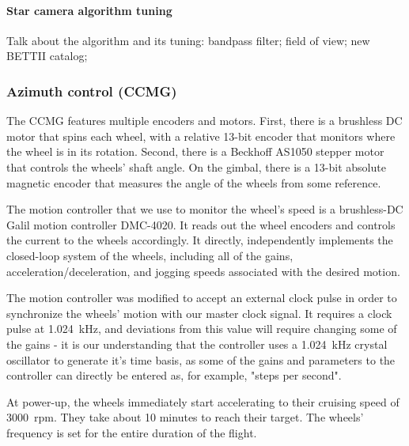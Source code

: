 \paragraph{Star camera algorithm tuning}

Talk about the algorithm and its tuning: bandpass filter; field of view; new BETTII catalog;
\subsubsection{Azimuth control (CCMG)}

The CCMG features multiple encoders and motors. First, there is a brushless DC motor that spins each wheel, with a relative 13-bit encoder that monitors where the wheel is in its rotation. Second, there is a Beckhoff AS1050 stepper motor that controls the wheels' shaft angle. On the gimbal, there is a 13-bit  absolute magnetic encoder that measures the angle of the wheels from some reference. 

The motion controller that we use to monitor the wheel's speed is a brushless-DC Galil motion controller DMC-4020. It reads out the wheel encoders and controls the current to the wheels accordingly. It directly, independently implements the closed-loop system of the wheels, including all of the gains, acceleration/deceleration, and jogging speeds associated with the desired motion.

The motion controller was modified to accept an external clock pulse in order to synchronize the wheels' motion with our master clock signal. It requires a clock pulse at \SI{1.024}{\kilo\hertz}, and deviations from this value will require changing some of the gains - it is our understanding that the controller uses a \SI{1.024}{\kilo\hertz} crystal oscillator to generate it's time basis, as some of the gains and parameters to the controller can directly be entered as, for example, "steps per second". 

At power-up, the wheels immediately start accelerating to their cruising speed of \num{3000}~rpm. They take about 10 minutes to reach their target. The wheels' frequency is set for the entire duration of the flight.

